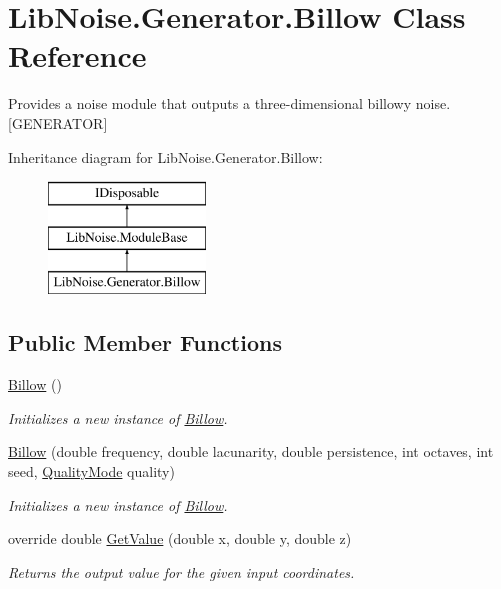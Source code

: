 \hypertarget{class_lib_noise_1_1_generator_1_1_billow}{}\section{Lib\+Noise.\+Generator.\+Billow Class Reference}
\label{class_lib_noise_1_1_generator_1_1_billow}


Provides a noise module that outputs a three-\/dimensional billowy noise. \mbox{[}G\+E\+N\+E\+R\+A\+T\+OR\mbox{]}  


Inheritance diagram for Lib\+Noise.\+Generator.\+Billow\+:\begin{figure}[H]
\begin{center}
\leavevmode
\includegraphics[height=3.000000cm]{class_lib_noise_1_1_generator_1_1_billow}
\end{center}
\end{figure}
\subsection*{Public Member Functions}
\begin{DoxyCompactItemize}
\item 
\hyperlink{class_lib_noise_1_1_generator_1_1_billow_a303f5832896163d36421f4485396cbd7}{Billow} ()
\begin{DoxyCompactList}\small\item\em Initializes a new instance of \hyperlink{class_lib_noise_1_1_generator_1_1_billow}{Billow}. \end{DoxyCompactList}\item 
\hyperlink{class_lib_noise_1_1_generator_1_1_billow_a87697381c612539bbdd44ded6e433b7b}{Billow} (double frequency, double lacunarity, double persistence, int octaves, int seed, \hyperlink{namespace_lib_noise_ab253d2180e71b8b4b51e250163ca0e27}{Quality\+Mode} quality)
\begin{DoxyCompactList}\small\item\em Initializes a new instance of \hyperlink{class_lib_noise_1_1_generator_1_1_billow}{Billow}. \end{DoxyCompactList}\item 
override double \hyperlink{class_lib_noise_1_1_generator_1_1_billow_a39be14a8776016efc89673bd86df9ee3}{Get\+Value} (double x, double y, double z)
\begin{DoxyCompactList}\small\item\em Returns the output value for the given input coordinates. \end{DoxyCompactList}\end{DoxyCompactItemize}
